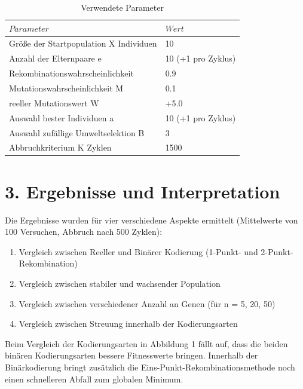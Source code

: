 \documentclass[12pt,
    a4paper,
    headinclude,
    footinclude]{scrreprt}
\begin{document}
\begin{table}[h]
	\centering
	\caption*{Verwendete Parameter}
	\begin{tabularx}{14cm}{|p{9cm}|X|}
		\hline
		$Parameter$ & $Wert$ \\
		\hline
		\hline
		Größe der Startpopulation X Individuen& 10  \\
				\hline
		Anzahl der Elternpaare e & 10 (+1 pro Zyklus)  \\
				\hline
		Rekombinationswahrscheinlichkeit& 0.9 \\
				\hline
		Mutationswahrscheinlichkeit M & 0.1 \\
				\hline
		reeller Mutationswert W& +5.0  \\
				\hline
		Auswahl bester Individuen a& 10 (+1 pro Zyklus) \\
		\hline
		Auswahl zufällige Umweltselektion B& 3 \\
		\hline
		Abbruchkriterium K Zyklen & 1500\\
		\hline
	\end{tabularx}
\end{table}


	
\section*{3. Ergebnisse und Interpretation}	

Die Ergebnisse wurden für vier verschiedene Aspekte ermittelt (Mittelwerte von 100 Versuchen, Abbruch nach 500 Zyklen):

\begin{enumerate}
	\item Vergleich zwischen Reeller und Binärer Kodierung (1-Punkt- und 2-Punkt-Rekombination)
    \item Vergleich zwischen stabiler und wachsender Population
    \item Vergleich zwischen verschiedener Anzahl an Genen (für n = 5, 20, 50)
    \item Vergleich zwischen Streuung innerhalb der Kodierungsarten 
\end{enumerate}

Beim Vergleich der Kodierungsarten in Abbildung 1 fällt auf, dass die beiden binären Kodierungsarten bessere Fitnesswerte bringen. Innerhalb der Binärkodierung bringt zusätzlich die Eins-Punkt-Rekombinationsmethode noch einen schnelleren Abfall zum globalen Minimum. 
\end{document}
